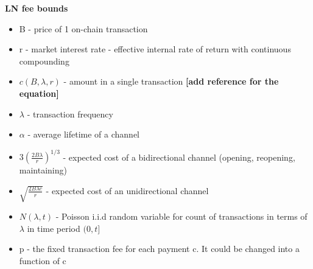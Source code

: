 \documentclass[12pt]{article}
\theoremstyle{plain}
\theoremstyle{remark}
\theoremstyle{definition}
\begin{document}
\begin{center}
\begin{Large}
\textbf{LN fee bounds}

\end{Large}
\end{center}

\begin{itemize}
  \item B - price of 1 on-chain transaction
  \item r - market interest rate - effective internal rate of return with continuous compounding
  \item $c(B,\lambda,r)$ - amount in a single transaction  \textbf{[add reference for the equation]}
  \item $\lambda$ - transaction frequency
  \item $\alpha$ - average lifetime of a channel
  \item $3(\frac{2B\lambda}{r})^{1/3}$ - expected cost of a bidirectional channel (opening, reopening, maintaining)
  \item $\sqrt{\frac{2B\lambda c}{r}}$ - expected cost of an unidirectional channel
  \item $N(\lambda, t)$ - Poisson i.i.d random variable for count of transactions in terms of $\lambda$ in time period $(0,t]$ 
  \item p - the fixed transaction fee for each payment c. It could be changed into a function of c
\end{itemize}
\end{document}
